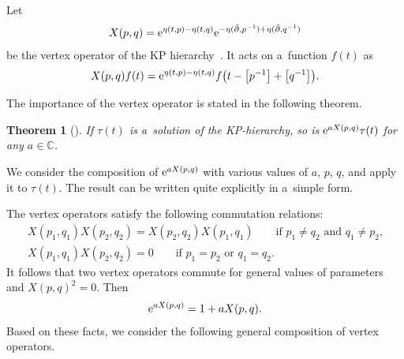\documentclass[pdftex]{sigma}
\numberwithin{equation}{section}
\newtheorem{Theorem}{Theorem}[section]
\theoremstyle{definition}
\begin{document}
Let
\begin{gather*}
X(p,q)={\rm e}^{\eta(t,p)-\eta(t,q)} {\rm e}^{-\eta(\tilde{\partial},p^{-1})+\eta(\tilde{\partial},q^{-1})}
\end{gather*}
be the vertex operator of the KP hierarchy~\cite{DJKM}.
It acts on a~function $f(t)$ as
\begin{gather}
X(p,q)f(t)={\rm e}^{\eta(t,p)-\eta(t,q)}f\bigl(t-\big[p^{-1}\big]+\big[q^{-1}\big]\bigr).
\label{action-X(p,q)}
\end{gather}

The importance of the vertex operator is stated in the following theorem.

\begin{Theorem}[\cite{DJKM}]
If $\tau(t)$ is a~solution of the KP-hierarchy, so is ${\rm e}^{aX(p,q)}\tau(t)$ for any
$a\in {\mathbb C}$.
\end{Theorem}

We consider the composition of ${\rm e}^{aX(p,q)}$ with various values of $a$, $p$, $q$, and
apply it to $\tau(t)$. The result can be written quite explicitly in a~simple form.

The vertex operators satisfy the following commutation relations:
\begin{gather*}
X(p_1,q_1)X(p_2,q_2)=X(p_2,q_2)X(p_1,q_1)
\qquad \text{if $p_1\neq q_2$ and $q_1\neq p_2$,} \\ X(p_1,q_1)X(p_2,q_2)=0
 \qquad \text{if $p_1=p_2$ or $q_1=q_2$}.
\end{gather*}
It follows that two vertex operators commute for general values
of parameters and $X(p,q)^2=0$. Then{\samepage
\begin{gather}
{\rm e}^{aX(p,q)}=1+aX(p,q).
\label{exp-X(p,q)}
\end{gather}
Based on these facts, we consider the following general composition of vertex operators.}
\end{document}
